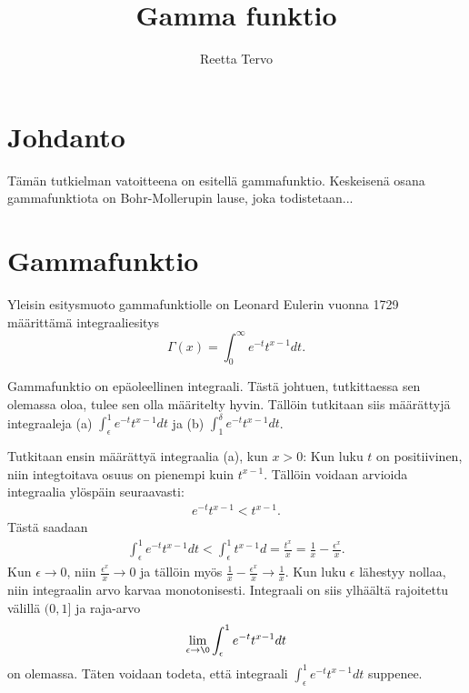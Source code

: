 \documentclass[12pt]{article}
\title{Gamma funktio}
\author{Reetta Tervo}
\theoremstyle{definition}
\theoremstyle{plain}
\begin{document}
\maketitle

\newpage
\tableofcontents

\newpage
\section{Johdanto}
\onehalfspacing
Tämän tutkielman vatoitteena on esitellä gammafunktio. Keskeisenä osana gammafunktiota on Bohr-Mollerupin lause, joka todistetaan...

\newpage





\section{Gammafunktio}
Yleisin esitysmuoto gammafunktiolle on Leonard Eulerin vuonna 1729 määrittämä integraaliesitys
\begin{equation}\label{yhtalo:gammafunktio}
     \Gamma(x) = \int_{0}^{\infty} e^{-t} t^{x-1} dt.
\end{equation}

Gammafunktio on epäoleellinen integraali. Tästä johtuen, tutkittaessa sen olemassa oloa, tulee sen olla määritelty hyvin. Tällöin tutkitaan siis määrättyjä integraaleja (a) $\int_{\epsilon}^{1} e^{-t} t^{x-1} dt$ ja (b) $\int_{1}^{\delta} e^{-t} t^{x-1} dt$.\newline

Tutkitaan ensin määrättyä integraalia (a), kun $x>0$:\newline
Kun luku $t$ on positiivinen, niin integtoitava osuus on pienempi kuin $t^{x-1}$. Tällöin voidaan arvioida integraalia ylöspäin seuraavasti:
\begin{align*}
    e^{-t} t^{x-1} < t^{x-1}.
\end{align*} 
Tästä saadaan 
\begin{align*}
    \int_{\epsilon}^{1} e^{-t} t^{x-1} dt < \int_{\epsilon}^{1} t^{x-1} d = \frac{t^x}{x} = \frac{1}{x} - \frac{\epsilon^x}{x}.
\end{align*}
Kun $\epsilon \rightarrow 0$, niin $\frac{\epsilon^x}{x} \rightarrow 0$ ja tällöin myös $\frac{1}{x}-\frac{\epsilon^x}{x} \rightarrow \frac{1}{x}$. Kun luku $\epsilon$ lähestyy nollaa, niin integraalin arvo karvaa monotonisesti. Integraali on siis ylhäältä rajoitettu välillä $(0, 1]$ ja raja-arvo
\begin{align*}
    \lim_{\epsilon\to\0}\int_\epsilon^{1}e^{-t}t^{x-1}dt
\end{align*}on olemassa. Täten voidaan todeta, että integraali $\int_{\epsilon}^{1} e^{-t} t^{x-1} dt$ suppenee. \newline
\end{document}
